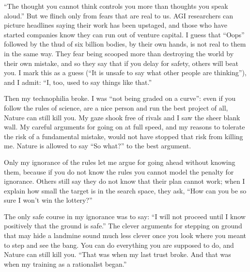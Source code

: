 ``The thought you cannot think controls you more than thoughts you speak aloud.'' But we flinch only from fears that are real to us. AGI researchers can picture headlines saying their work has been upstaged, and those who have started companies know they can run out of venture capital. I guess that ``Oops'' followed by the thud of six billion bodies, by their own hands, is not real to them in the same way. They fear being scooped more than destroying the world by their own mistake, and so they say that if you delay for safety, others will beat you. I mark this as a guess (``It is unsafe to say what other people are thinking''), and I admit: ``I, too, used to say things like that.'' 

Then my technophilia broke. I was ``not being graded on a curve'': even if you follow the rules of science, are a nice person and run the best project of all, Nature can still kill you. My gaze shook free of rivals and I saw the sheer blank wall. My careful arguments for going on at full speed, and my reasons to tolerate the risk of a fundamental mistake, would not have stopped that risk from killing me. Nature is allowed to say ``So what?'' to the best argument.

Only my ignorance of the rules let me argue for going ahead without knowing them, because if you do not know the rules you cannot model the penalty for ignorance. Others still say they do not know that their plan cannot work; when I explain how small the target is in the search space, they ask, ``How can you be so sure I won't win the lottery?'' 

The only safe course in my ignorance was to say: ``I will not proceed until I know positively that the ground is safe.'' The clever arguments for stepping on ground that may hide a landmine sound much less clever once you look where you meant to step and see the bang. You can do everything you are supposed to do, and Nature can still kill you. ``That was when my last trust broke. And that was when my training as a rationalist began.''
